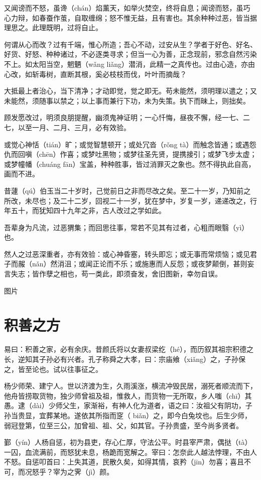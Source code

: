 \documentclass[12pt,UTF8]{ctexbook}
\begin{document}
又闻谤而不怒，虽谗（chán）焰薰天，如举火焚空，终将自息；闻谤而怒，虽巧心力辩，如春蚕作茧，自取缠绵；怒不惟无益，且有害也。其余种种过恶，皆当据理思之。此理既明，过将自止。

何谓从心而改？过有千端，惟心所造；吾心不动，过安从生？学者于好色、好名、好货、好怒、种种诸过，不必逐类寻求；但当一心为善，正念现前，邪念自然污染不上。如太阳当空，魍魉（wǎng  liǎng）潜消，此精一之真传也。过由心造，亦由心改，如斩毒树，直断其根，奚必枝枝而伐，叶叶而摘哉？

大抵最上者治心，当下清净；才动即觉，觉之即无。苟未能然，须明理以遣之；又未能然，须随事以禁之；以上事而兼行下功，未为失策。执下而昧上，则拙矣。

顾发愿改过，明须良朋提醒，幽须鬼神证明；一心忏悔，昼夜不懈，经一七、二七，以至一月、二月、三月，必有效验。

或觉心神恬（tián）旷；或觉智慧顿开；或处冗沓（rǒng  tà）而触念皆通；或遇怨仇而回嗔（chēn）作喜；或梦吐黑物；或梦往圣先贤，提携接引；或梦飞步太虚；或梦幢幡（chuáng  fān）宝盖，种种胜事，皆过消罪灭之象也。然不得执此自高，画而不进。

昔蘧（qú）伯玉当二十岁时，己觉前日之非而尽改之矣。至二十一岁，乃知前之所改，未尽也；及二十二岁，回视二十一岁，犹在梦中，岁复一岁，递递改之，行年五十，而犹知四十九年之非，古人改过之学如此。

吾辈身为凡流，过恶猬集；而回思往事，常若不见其有过者，心粗而眼翳（yì）也。

然人之过恶深重者，亦有效验：或心神昏塞，转头即忘；或无事而常烦恼；或见君子而赧（nǎn）然消沮；或闻正论而不乐；或施惠而人反怨；或夜梦颠倒，甚则妄言失志；皆作孽之相也，苟一类此，即须奋发，舍旧图新，幸勿自误。

图片

\chapter{积善之方}

易曰：积善之家，必有余庆。昔颜氏将以女妻叔梁纥（hé），而历叙其祖宗积德之长，逆知其子孙必有兴者。孔子称舜之大孝，曰：宗庙飨（xiǎng）之，子孙保之，皆至论也。试以往事征之。

杨少师荣、建宁人。世以济渡为生，久雨溪涨，横流冲毁民居，溺死者顺流而下，他舟皆捞取货物，独少师曾祖及祖，惟救人，而货物一无所取，乡人嗤（chī）其愚。逮（dài）少师父生，家渐裕，有神人化为道者，语之曰：汝祖父有阴功，子孙当贵显，宜葬某地。遂依其所指而窆（ biǎn）之，即今白兔坟也。后生少师，弱冠登第，位至三公，加曾祖、祖、父，如其官。子孙贵盛，至今尚多贤者。

鄞（yín）人杨自惩，初为县吏，存心仁厚，守法公平。时县宰严肃，偶挞（tà）一囚，血流满前，而怒犹未息，杨跪而宽解之。宰曰：怎奈此人越法悖理，不由人不怒。自惩叩首曰：上失其道，民散久矣，如得其情，哀矜（jīn）勿喜；喜且不可，而况怒乎？宰为之霁（jì）颜。
\end{document}
